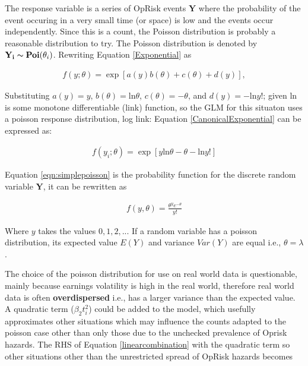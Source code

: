 \documentclass{DissertateUSU}
\begin{document}
The response variable is a series of OpRisk events \(\mathbf{Y}\) where
the probability of the event occuring in a very small time (or space) is
low and the events occur independently. Since this is a count, the
Poisson distribution is probably a reasonable distribution to try. The
Poisson distribution is denoted by
\(\mathbf{Y_i} \thicksim \mathbf{Poi}(\theta_i)\). Rewriting Equation
\ref{Exponential} as

\singlespacing

\begin{eqnarray}\label{CanonicalExponential}
f(y;\theta) = \exp[a(y)b(\theta) + c(\theta) + d(y)],
\end{eqnarray} \doublespacing

Substituting \(a(y)=y\), \(b(\theta) = \mbox{ln}\theta\),
\(c(\theta) = -\theta\), and \(d(y) = -\mbox{ln}y!\); given
\(\mbox{ln}\) is some monotone differentiable (link) function, so the
GLM for this situaton uses a poisson response distribution, log link:
Equation \ref{CanonicalExponential} can be expressed as:

\singlespacing

\begin{eqnarray}\label{eqn:simplepoisson}
f(y_i;\theta) = \exp{\left[y\mbox{ln}\theta - \theta -\mbox{ln}y!\right]}
\end{eqnarray} \doublespacing

Equation \ref{eqn:simplepoisson} is the probability function for the
discrete random variable \(\mathbf{Y}\), it can be rewritten as

\singlespacing

\begin{eqnarray}\label{POISSON}
f(y,\theta) = \frac{\theta^ye^{-\theta}}{y!}
\end{eqnarray} \doublespacing

Where \(y\) takes the values \(0,1,2,..\). If a random variable has a
poisson distribution, its expected value \(E(Y)\) and variance
\(Var(Y)\) are equal i.e., \(\theta =\lambda\).\medskip

The choice of the poisson distribution for use on real world data is
questionable, mainly because earnings volatility is high in the real
world, therefore real world data is often \textbf{overdispersed} i.e.,
has a larger variance than the expected value. A quadratic term
(\(\beta_2t_i^2\)) could be added to the model, which usefully
approximates other situations which may influence the counts adapted to
the poisson case other than only those due to the unchecked prevalence
of Oprisk hazards. The RHS of Equation \ref{linearcombination} with the
quadratic term so other situations other than the unrestricted spread of
OpRisk hazards becomes
\end{document}
